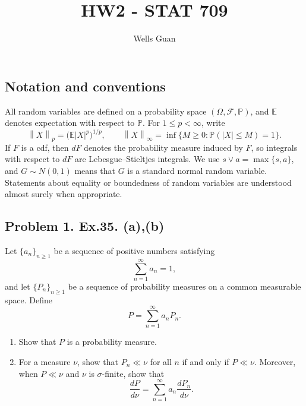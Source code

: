 \documentclass[lang=en,11pt,a4paper,citestyle=authoryear]{elegantpaper}
\title{HW2 - STAT 709}
\author{Wells Guan}
\newcommand{\E}{\mathbb{E}}
\renewcommand{\P}{\mathbb{P}}
\newcommand{\norm}[1]{\left\lVert#1\right\rVert}
\begin{document}
\maketitle
\subsection*{Notation and conventions}

All random variables are defined on a probability space
$(\Omega,\mathcal F,\P)$, and $\E$ denotes expectation with respect to
$\P$. For $1\leq p<\infty$, write
\[
\norm{X}_p=\bigl(\E|X|^p\bigr)^{1/p},
\qquad
\norm{X}_\infty
=\inf\{M\geq0:\P(|X|\leq M)=1\}.
\]
If $F$ is a cdf, then $dF$ denotes the probability measure induced by $F$,
so integrals with respect to $dF$ are Lebesgue--Stieltjes integrals. We use
$s\vee a=\max\{s,a\}$, and $G\sim N(0,1)$ means that $G$ is a standard
normal random variable. Statements about equality or boundedness of random
variables are understood almost surely when appropriate.



\subsection*{Problem 1. Ex.35. (a),(b)}

Let $\{a_n\}_{n\geq1}$ be a sequence of positive numbers satisfying
\[
\sum_{n=1}^{\infty}a_n=1,
\]
and let $\{P_n\}_{n\geq1}$ be a sequence of probability measures on a common
measurable space. Define
\[
P=\sum_{n=1}^{\infty}a_nP_n.
\]
\begin{enumerate}[label=(\alph*),leftmargin=*]
    \item Show that $P$ is a probability measure.
    \item For a measure $\nu$, show that $P_n\ll\nu$ for all $n$ if and only
    if $P\ll\nu$. Moreover, when $P\ll\nu$ and $\nu$ is $\sigma$-finite,
    show that
    \[
    \frac{dP}{d\nu}
    =\sum_{n=1}^{\infty}a_n\frac{dP_n}{d\nu}.
    \]
\end{enumerate}
\end{document}
